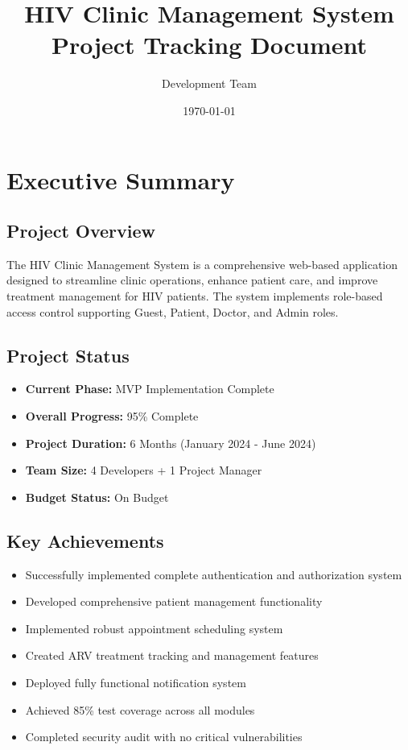 \documentclass[12pt,a4paper]{article}
\title{\textbf{HIV Clinic Management System \\
Project Tracking Document}}
\author{Development Team}
\date{\today}
\begin{document}
\maketitle

\tableofcontents
\newpage

\section{Executive Summary}

\subsection{Project Overview}
The HIV Clinic Management System is a comprehensive web-based application designed to streamline clinic operations, enhance patient care, and improve treatment management for HIV patients. The system implements role-based access control supporting Guest, Patient, Doctor, and Admin roles.

\subsection{Project Status}
\begin{itemize}
    \item \textbf{Current Phase:} MVP Implementation Complete
    \item \textbf{Overall Progress:} 95\% Complete
    \item \textbf{Project Duration:} 6 Months (January 2024 - June 2024)
    \item \textbf{Team Size:} 4 Developers + 1 Project Manager
    \item \textbf{Budget Status:} On Budget
\end{itemize}

\subsection{Key Achievements}
\begin{itemize}
    \item Successfully implemented complete authentication and authorization system
    \item Developed comprehensive patient management functionality
    \item Implemented robust appointment scheduling system
    \item Created ARV treatment tracking and management features
    \item Deployed fully functional notification system
    \item Achieved 85\% test coverage across all modules
    \item Completed security audit with no critical vulnerabilities
\end{itemize}
\end{document}
